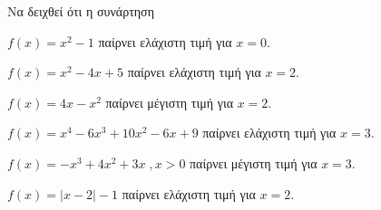Να δειχθεί ότι η συνάρτηση
\begin{alist}
\item $ f(x)=x^2-1 $ παίρνει ελάχιστη τιμή για $ x=0 $.
\item $ f(x)=x^2-4x+5 $ παίρνει ελάχιστη τιμή για $ x=2 $.
\item $ f(x)=4x-x^2 $ παίρνει μέγιστη τιμή για $ x=2 $.
\item $ f(x)=x^4-6x^3+10x^2-6x+9 $ παίρνει ελάχιστη τιμή για $ x=3 $.
\item $ f(x)=-x^3+4x^2+3x\;, x>0 $ παίρνει μέγιστη τιμή για $ x=3 $.
\item $ f(x)=|x-2|-1 $ παίρνει ελάχιστη τιμή για $ x=2 $.
\end{alist}
